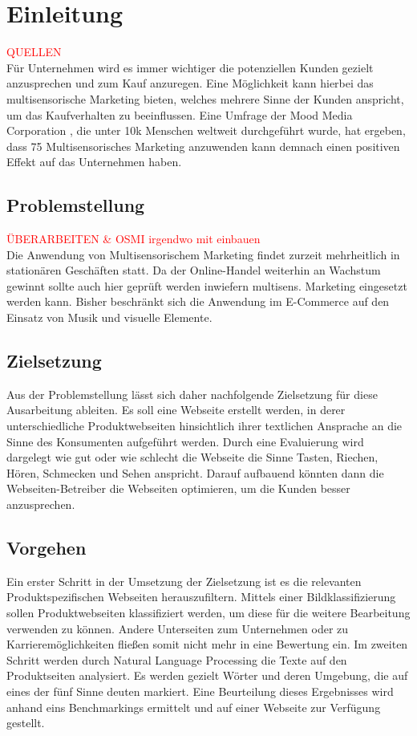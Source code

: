 \section{Einleitung}  \textcolor{red}{QUELLEN} \\
Für Unternehmen wird es immer wichtiger die potenziellen Kunden gezielt anzusprechen und zum Kauf anzuregen. Eine Möglichkeit kann hierbei das multisensorische Marketing bieten, welches mehrere Sinne der Kunden anspricht, um das Kaufverhalten zu beeinflussen. Eine Umfrage der Mood Media Corporation , die unter 10k Menschen weltweit durchgeführt wurde, hat ergeben, dass 75%
Multisensorisches Marketing anzuwenden kann demnach einen positiven Effekt auf das Unternehmen haben.

\subsection{Problemstellung}
\textcolor{red}{ÜBERARBEITEN \& OSMI irgendwo mit einbauen} \\
Die Anwendung von Multisensorischem Marketing findet zurzeit mehrheitlich in stationären Geschäften statt. Da der Online-Handel weiterhin an Wachstum gewinnt sollte auch hier geprüft werden inwiefern multisens. Marketing eingesetzt werden kann.
Bisher beschränkt sich die Anwendung im E-Commerce auf den Einsatz von Musik und visuelle Elemente.

\subsection{Zielsetzung}
Aus der Problemstellung lässt sich daher nachfolgende Zielsetzung für diese Ausarbeitung ableiten. Es soll eine Webseite erstellt werden, in derer unterschiedliche Produktwebseiten hinsichtlich ihrer textlichen Ansprache an die Sinne des Konsumenten aufgeführt werden. Durch eine Evaluierung wird dargelegt wie gut oder wie schlecht die Webseite die Sinne Tasten, Riechen, Hören, Schmecken und Sehen anspricht.
Darauf aufbauend könnten dann die Webseiten-Betreiber die Webseiten optimieren, um die Kunden besser anzusprechen.

\subsection{Vorgehen}
Ein erster Schritt in der Umsetzung der Zielsetzung ist es die relevanten Produktspezifischen Webseiten herauszufiltern. Mittels einer Bildklassifizierung sollen Produktwebseiten klassifiziert werden, um diese für die weitere Bearbeitung verwenden zu können. Andere Unterseiten zum Unternehmen oder zu Karrieremöglichkeiten fließen somit nicht mehr in eine Bewertung ein. Im zweiten Schritt werden durch Natural Language Processing die Texte auf den Produktseiten analysiert. Es werden gezielt Wörter und deren Umgebung, die auf eines der fünf Sinne deuten markiert.
Eine Beurteilung dieses Ergebnisses wird anhand eins Benchmarkings ermittelt und auf einer Webseite zur Verfügung gestellt.

